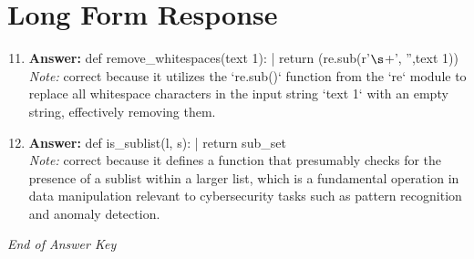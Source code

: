 \documentclass[12pt]{article}
\begin{document}
\section*{Long Form Response}
\begin{enumerate}[label=\arabic*.]
\setcounter{enumi}{10}
\item \textbf{Answer:} def remove\_whitespaces(text 1): | return (re.sub(r'\ensuremath{\s}+', '',text 1))
\\ \textit{Note:} correct because it utilizes the `re.sub()` function from the `re` module to replace all whitespace characters in the input string `text 1` with an empty string, effectively removing them.
\item \textbf{Answer:} def is\_sublist(l, s): | return sub\_set
\\ \textit{Note:} correct because it defines a function that presumably checks for the presence of a sublist within a larger list, which is a fundamental operation in data manipulation relevant to cybersecurity tasks such as pattern recognition and anomaly detection.
\end{enumerate}

\vfill
\noindent\textit{End of Answer Key}
\end{document}
